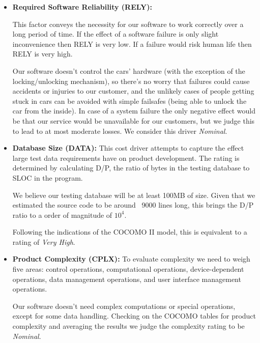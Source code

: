 \documentclass[english]{article}
\begin{document}
\begin{itemize}

\item \textbf{Required Software Reliability (RELY):} 

This factor conveys the necessity for our software to work correctly over a long period of time. If the effect of a software failure is only slight inconvenience then RELY is very low. If a failure would risk human life then RELY is very high.

Our software doesn't control the cars' hardware (with the exception of the locking/unlocking mechanism), so there's no worry that failures could cause accidents or injuries to our customer, and the unlikely cases of people getting stuck in cars can be avoided with simple failsafes (being able to unlock the car from the inside). In case of a system failure the only negative effect would be that our service would be unavailable for our customers, but we judge this to lead to at most moderate losses. We consider this driver \textit{Nominal}.

\item \textbf{Database Size (DATA):} This cost driver attempts to capture the effect large test data requirements have on product development. The rating is determined by calculating D/P, the ratio of bytes in the testing database to SLOC in the program.

We believe our testing database will be at least 100MB of size. Given that we estimated the source code to be around ~9000 lines long, this brings the D/P ratio to a order of magnitude of $10^4$.

Following the indications of the COCOMO II model, this is equivalent to a rating of \textit{Very High}.


\item \textbf{Product Complexity (CPLX):} To evaluate complexity we need to weigh five areas: control operations, computational operations, device-dependent operations, data management operations, and user interface management operations.

Our software doesn't need complex computations or special operations, except for some data handling.
Checking on the COCOMO tables for product complexity and averaging the results we judge the complexity rating to be \textit{Nominal}.


\end{itemize}
\end{document}
